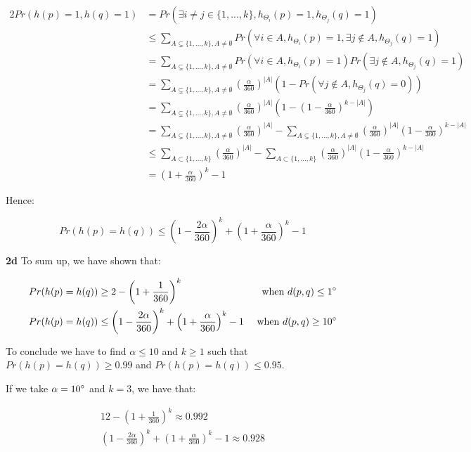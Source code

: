 \documentclass[10pt,a4paper]{article}
\theoremstyle{plain}
\begin{document}
\begin{alignat*}{2}
Pr(h(p) = 1, h(q) = 1) & = Pr(\exists i \neq j \in \{1, ..., k\}, h_{\Theta_i}(p) = 1, h_{\Theta_j}(q) = 1) \\
& \leq \sum_{A \subsetneq \{1, ..., k\}, A \neq \emptyset}{Pr(\forall i \in A, h_{\Theta_i}(p) = 1, \exists j \not \in A, h_{\Theta_j}(q) = 1)} \\
& = \sum_{A \subsetneq \{1, ..., k\}, A \neq \emptyset}{Pr(\forall i \in A, h_{\Theta_i}(p) = 1)Pr(\exists j \not \in A, h_{\Theta_j}(q) = 1)} \\
& = \sum_{A \subsetneq \{1, ..., k\}, A \neq \emptyset}{\left(\frac{\alpha}{360}\right)^{|A|}(1 - Pr(\forall j \not \in A, h_{\Theta_j}(q) = 0))} \\
& = \sum_{A \subsetneq \{1, ..., k\}, A \neq \emptyset}{\left(\frac{\alpha}{360}\right)^{|A|}\left(1 - \left(1 - \frac{\alpha}{360}\right)^{k-|A|}\right)} \\
& = \sum_{A \subsetneq \{1, ..., k\}, A \neq \emptyset}{\left(\frac{\alpha}{360}\right)^{|A|}} - \sum_{A \subsetneq \{1, ..., k\}, A \neq \emptyset}{\left(\frac{\alpha}{360}\right)^{|A|}\left(1 - \frac{\alpha}{360}\right)^{k-|A|}} \\
& \leq \sum_{A \subset \{1, ..., k\}}{\left(\frac{\alpha}{360}\right)^{|A|}} - \sum_{A \subset \{1, ..., k\}}{\left(\frac{\alpha}{360}\right)^{|A|}\left(1 - \frac{\alpha}{360}\right)^{k-|A|}} \\
& = \left(1 + \frac{\alpha}{360}\right)^{k} - 1
\end{alignat*}

Hence:

$$Pr(h(p) = h(q)) \leq \left(1 - \frac{2\alpha}{360}\right)^k + \left(1 + \frac{\alpha}{360}\right)^{k} - 1
$$

\textbf{2d} To sum up, we have shown that:

\begin{alignat*}{3}
Pr(h(p) = h(q)) & \geq 2 - \left(1 + \frac{1}{360}\right)^k & \text{ when } d(p, q) \leq 1\degree \\
Pr(h(p) = h(q)) & \leq \left(1 - \frac{2\alpha}{360}\right)^k + \left(1 + \frac{\alpha}{360}\right)^{k} -  1 & \text{ when } d(p, q) \geq 10\degree \\
\end{alignat*}

To conclude we have to find $\alpha \leq 10$ and $k \geq 1$ such that $Pr(h(p) = h(q)) \geq 0.99$ and $Pr(h(p) = h(q)) \leq 0.95$.

If we take $\alpha = 10\degree$ and $k = 3$, we have that:

\begin{alignat*}{1}
2 - \left(1 + \frac{1}{360}\right)^k \approx 0.992 \\
\left(1 - \frac{2\alpha}{360}\right)^k + \left(1 + \frac{\alpha}{360}\right)^{k} -  1 \approx 0.928 \\
\end{alignat*}
\end{document}

